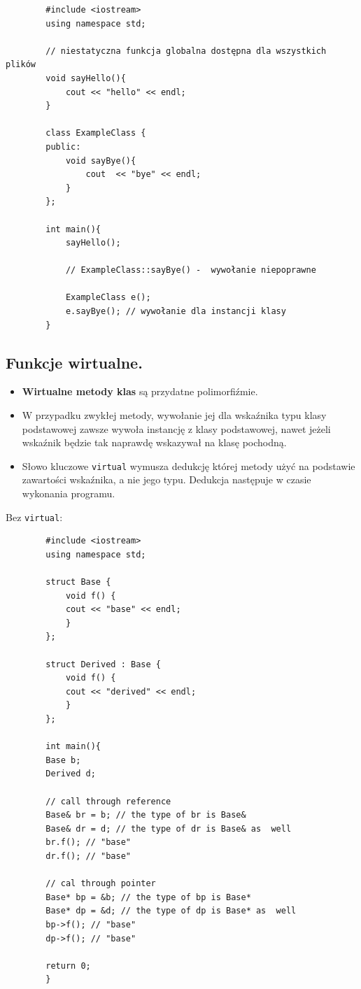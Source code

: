 \documentclass[12pt]{article}
\begin{document}
    \begin{verbatim}
        #include <iostream>
        using namespace std;

        // niestatyczna funkcja globalna dostępna dla wszystkich plików
        void sayHello(){
            cout << "hello" << endl;
        }

        class ExampleClass {
        public:
            void sayBye(){
                cout  << "bye" << endl;
            }
        };

        int main(){
            sayHello();

            // ExampleClass::sayBye() -  wywołanie niepoprawne

            ExampleClass e();
            e.sayBye(); // wywołanie dla instancji klasy
        }
    \end{verbatim}

    \subsection{Funkcje wirtualne.}
    \begin{itemize}
        \item \textbf{Wirtualne metody klas} są przydatne polimorfiźmie.
        \item W przypadku zwykłej metody, wywołanie jej dla wskaźnika typu klasy podstawowej zawsze wywoła instancję
        z klasy podstawowej, nawet jeżeli wskaźnik będzie tak naprawdę wskazywał na klasę pochodną.
        \item Słowo kluczowe \texttt{virtual} wymusza dedukcję której metody użyć na podstawie zawartości wskaźnika,
        a nie jego typu. Dedukcja następuje w czasie wykonania programu.
    \end{itemize}

    Bez \texttt{virtual}:
    \begin{verbatim}
        #include <iostream>
        using namespace std;

        struct Base {
            void f() {
            cout << "base" << endl;
            }
        };

        struct Derived : Base {
            void f() {
            cout << "derived" << endl;
            }
        };

        int main(){
        Base b;
        Derived d;

        // call through reference
        Base& br = b; // the type of br is Base&
        Base& dr = d; // the type of dr is Base& as  well
        br.f(); // "base"
        dr.f(); // "base"

        // cal through pointer
        Base* bp = &b; // the type of bp is Base*
        Base* dp = &d; // the type of dp is Base* as  well
        bp->f(); // "base"
        dp->f(); // "base"

        return 0;
        }
    \end{verbatim}
\end{document}
